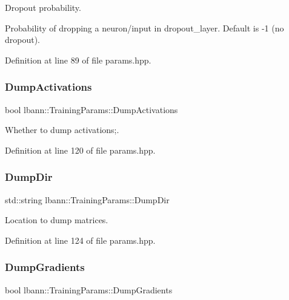 Dropout probability. 

Probability of dropping a neuron/input in dropout\+\_\+layer. Default is -\/1 (no dropout). 

Definition at line 89 of file params.\+hpp.

\mbox{\label{classlbann_1_1TrainingParams_a4707689cbc2dd7cd45d05bf18026f2f4}} 
\subsubsection{\texorpdfstring{Dump\+Activations}{DumpActivations}}
{\footnotesize\ttfamily bool lbann\+::\+Training\+Params\+::\+Dump\+Activations}



Whether to dump activations;. 



Definition at line 120 of file params.\+hpp.

\mbox{\label{classlbann_1_1TrainingParams_a56e113da8b3b5acc6a26ac710c1d77d8}} 
\subsubsection{\texorpdfstring{Dump\+Dir}{DumpDir}}
{\footnotesize\ttfamily std\+::string lbann\+::\+Training\+Params\+::\+Dump\+Dir}



Location to dump matrices. 



Definition at line 124 of file params.\+hpp.

\mbox{\label{classlbann_1_1TrainingParams_a88d652f4579b464ce6d961712d7b0235}} 
\subsubsection{\texorpdfstring{Dump\+Gradients}{DumpGradients}}
{\footnotesize\ttfamily bool lbann\+::\+Training\+Params\+::\+Dump\+Gradients}



